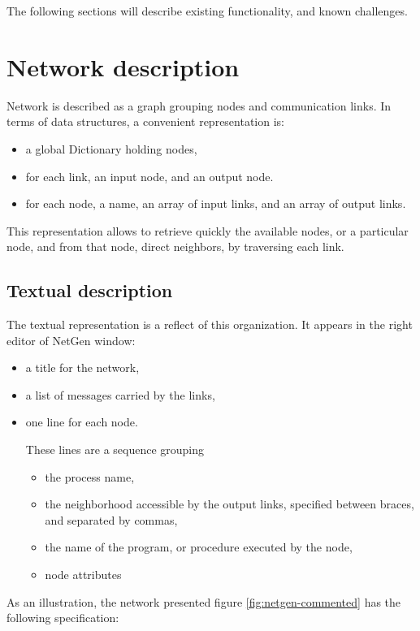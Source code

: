 \documentclass[times,a4paper]{book}
\begin{document}
The following sections will describe existing functionality, and known challenges.


\section{Network description}

Network is described as a graph grouping nodes and communication links. In terms of data structures,
a convenient  representation is:

\begin{itemize}
\item a global Dictionary holding nodes,
\item for each link, an input node, and an output node.
\item for each node, a name, an array of input links, and an array of output links.
\end{itemize}

This representation allows to retrieve quickly the available nodes, or a particular node,
and from that node, direct neighbors, by traversing each link.

\subsection{Textual description}

The textual representation is a reflect of this organization. It appears in the right editor of NetGen window:


\begin{itemize}
\item  a title for the network, 
\item a list of messages carried by the links, 
\item  one line for each node.

These lines are a sequence grouping
\begin{itemize}
\item  the process name,
\item the neighborhood accessible by the output links, specified between braces, and separated by commas,
\item the name of the program, or procedure executed by the node,
\item node attributes
\end{itemize}

\end{itemize}

As an illustration, the network presented  figure \ref{fig:netgen-commented}  has the following specification:
  
\end{document}
